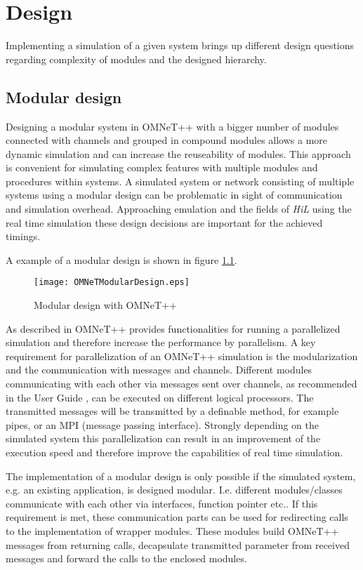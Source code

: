 \chapter{Design}
\label{cha:design}
Implementing a simulation of a given system brings up different design questions regarding complexity of modules and the designed hierarchy.

\section{Modular design}
\label{sec:design_modular}
Designing a modular system in OMNeT++ with a bigger number of modules connected with channels and grouped in compound modules allows a more dynamic simulation and can increase the reuseability of modules.
This approach is convenient for simulating complex features with multiple modules and procedures within systems.
A simulated system or network consisting of multiple systems using a modular design can be problematic in sight of communication and simulation overhead.
Approaching emulation and the fields of \emph{HiL} using the real time simulation these design decisions are important for the achieved timings.

A example of a modular design is shown in figure \ref{fig:OMNeTModularDesign}.

\begin{figure}
    \centering
    \texttt{[image: OMNeTModularDesign.eps]}
    \caption{Modular design with OMNeT++}
    \label{fig:OMNeTModularDesign}
\end{figure}

As described in \cite[2.8]{varga_overview_2008} OMNeT++ provides functionalities for running a parallelized simulation and therefore increase the performance by parallelism.
A key requirement for parallelization of an OMNeT++ simulation is the modularization and the communication with messages and channels.
Different modules communicating with each other via messages sent over channels, as recommended in the User Guide \cite{omnet_manual}, can be executed on different logical processors.
The transmitted messages will be transmitted by a definable method, for example pipes, or an MPI (message passing interface).
Strongly depending on the simulated system this parallelization can result in an improvement of the execution speed and therefore improve the capabilities of real time simulation.

The implementation of a modular design is only possible if the simulated system, e.g. an existing application, is designed modular.
I.e. different modules/classes communicate with each other via interfaces, function pointer etc..
If this requirement is met, these communication parts can be used for redirecting calls to the implementation of wrapper modules.
These modules build OMNeT++ messages from returning calls, decapsulate transmitted parameter from received messages and forward the calls to the enclosed modules.

